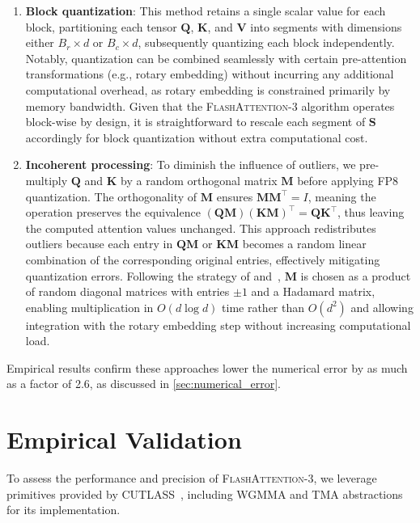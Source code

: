 \begin{enumerate}

\item \textbf{Block quantization}: This method retains a single scalar value for each block, partitioning each tensor $\mathbf{Q}$, $\mathbf{K}$, and $\mathbf{V}$ into segments with dimensions either $B_r \times d$ or $B_c \times d$, subsequently quantizing each block independently. Notably, quantization can be combined seamlessly with certain pre-attention transformations (e.g., rotary embedding) without incurring any additional computational overhead, as rotary embedding is constrained primarily by memory bandwidth. Given that the \textsc{FlashAttention-3} algorithm operates block-wise by design, it is straightforward to rescale each segment of $\mathbf{S}$ accordingly for block quantization without extra computational cost.

\item \textbf{Incoherent processing}: To diminish the influence of outliers, we pre-multiply $\mathbf{Q}$ and $\mathbf{K}$ by a random orthogonal matrix $\mathbf{M}$ before applying FP8 quantization. The orthogonality of $\mathbf{M}$ ensures $\mathbf{M} \mathbf{M}^\top = I$, meaning the operation preserves the equivalence $(\mathbf{Q} \mathbf{M}) (\mathbf{K} \mathbf{M})^\top = \mathbf{Q} \mathbf{K}^\top$, thus leaving the computed attention values unchanged. This approach redistributes outliers because each entry in $\mathbf{Q} \mathbf{M}$ or $\mathbf{K} \mathbf{M}$ becomes a random linear combination of the corresponding original entries, effectively mitigating quantization errors. Following the strategy of \citet{chee2024quip} and~\citet{tseng2024quip}, $\mathbf{M}$ is chosen as a product of random diagonal matrices with entries $\pm 1$ and a Hadamard matrix, enabling multiplication in $O(d \log d)$ time rather than $O(d^2)$ and allowing integration with the rotary embedding step without increasing computational load.
\end{enumerate}

Empirical results confirm these approaches lower the numerical error by as much as a factor of 2.6, as discussed in \cref{sec:numerical_error}.

\section{Empirical Validation}
\label{sec:exp}

To assess the performance and precision of \textsc{FlashAttention-3}, we leverage primitives provided by CUTLASS~\citep{Thakkar_CUTLASS_2023}, including WGMMA and TMA abstractions for its implementation.


